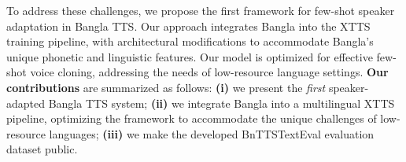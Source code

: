 To address these challenges, we propose the first framework for few-shot speaker adaptation in Bangla TTS. Our approach integrates Bangla into the XTTS training pipeline, with architectural modifications to accommodate Bangla’s unique phonetic and linguistic features. Our model is optimized for effective few-shot voice cloning, addressing the needs of low-resource language settings. \textbf{Our contributions} are summarized as follows: \textbf{(i)} we present the \textit{first} speaker-adapted Bangla TTS system; \textbf{(ii)} we integrate Bangla into a multilingual XTTS pipeline, optimizing the framework to accommodate the unique challenges of low-resource languages; \textbf{(iii)} we make the developed BnTTSTextEval evaluation dataset public.




